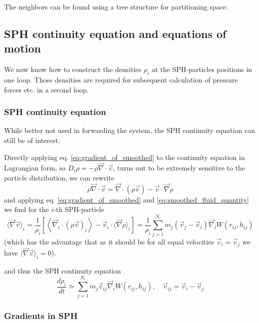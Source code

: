 The neighbors can be found using a tree structure for partitioning space.

\subsection{SPH continuity equation and equations of motion}
We now know how to construct the densities $\rho_i$ at the
SPH-particles positions in one loop. Those densities are required
for subsequent calculation of pressure forces etc. in a second loop.

\subsubsection{SPH continuity equation}
While better not used in forwarding the system, the SPH continuity equation
can still be of interest.

Directly applying eq. \ref{eq:gradient_of_smoothed} to the continuity equation
in Lagrangian form, so $D_t \rho = -\rho \vec{\nabla} \cdot \vec{v}$, turns out
to be extremely sensitive to the particle distribution, we can rewrite
\begin{equation}
    \rho \vec{\nabla} \cdot \vec{v} = \vec{\nabla} \cdot (\rho \vec{v}) - \vec{v} \cdot \vec{\nabla} \rho
\end{equation}
and applying eq. \ref{eq:gradient_of_smoothed} and \ref{eq:smoothed_fluid_quantity} we find
for the $i$-th SPH-particle
\begin{equation}
    \langle\vec{\nabla} \vec{v}\rangle_i=\frac{1}{\rho_i}\left[\left\langle\vec{\nabla}_i \cdot(\rho \vec{v})_i\right\rangle-\vec{v}_i \cdot\langle\vec{\nabla} \rho\rangle_i\right]=\frac{1}{\rho_i} \sum_{j=1}^{N_i} m_j\left(\vec{v}_j-\vec{v}_i\right) \vec{\nabla}_i W\left(r_{i j}, h_{i j}\right)
\end{equation}
(which has the advantage that as it should be for all equal velocities $\vec{v}_i = \vec{v}_j$ we have $\langle\vec{\nabla} \vec{v}\rangle_i = 0$).
\begin{mdframed}[style=padded]
    and thus the SPH continuity equation
    \begin{equation}
        \frac{d \rho_i}{d t} \simeq \sum_{j=1}^{N_i} m_j \vec{v}_{i j} \vec{\nabla}_i W\left(r_{i j}, h_{i j}\right), \quad \vec{v}_{i j}=\vec{v}_i-\vec{v}_j
    \end{equation}
\end{mdframed}

\subsubsection{Gradients in SPH}

